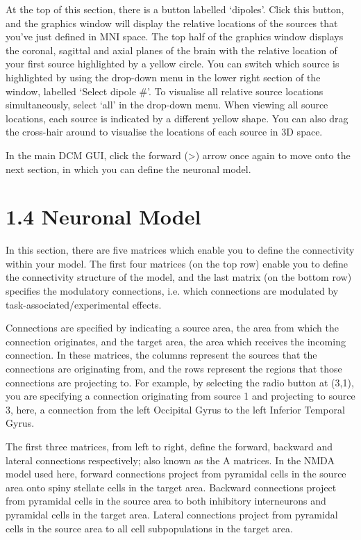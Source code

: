 At the top of this section, there is a button labelled `dipoles'. Click
this button, and the graphics window will display the relative locations
of the sources that you've just defined in MNI space. The top half of
the graphics window displays the coronal, sagittal and axial planes of
the brain with the relative location of your first source highlighted by
a yellow circle. You can switch which source is highlighted by using the
drop-down menu in the lower right section of the window, labelled
`Select dipole \#'. To visualise all relative source locations
simultaneously, select `all' in the drop-down menu. When viewing all
source locations, each source is indicated by a different yellow shape.
You can also drag the cross-hair around to visualise the locations of
each source in 3D space.

In the main DCM GUI, click the forward (\textgreater{}) arrow once again
to move onto the next section, in which you can define the neuronal
model.

\section{\texorpdfstring{\textbf{1.4 Neuronal
Model}}{1.4 Neuronal Model}}\label{neuronal-model}

In this section, there are five matrices which enable you to define the
connectivity within your model. The first four matrices (on the top row)
enable you to define the connectivity structure of the model, and the
last matrix (on the bottom row) specifies the modulatory connections,
i.e. which connections are modulated by task-associated/experimental
effects.

Connections are specified by indicating a source area, the area from
which the connection originates, and the target area, the area which
receives the incoming connection. In these matrices, the columns
represent the sources that the connections are originating from, and the
rows represent the regions that those connections are projecting to. For
example, by selecting the radio button at (3,1), you are specifying a
connection originating from source 1 and projecting to source 3, here, a
connection from the left Occipital Gyrus to the left Inferior Temporal
Gyrus.

The first three matrices, from left to right, define the forward,
backward and lateral connections respectively; also known as the A
matrices. In the NMDA model used here, forward connections project from
pyramidal cells in the source area onto spiny stellate cells in the
target area. Backward connections project from pyramidal cells in the
source area to both inhibitory interneurons and pyramidal cells in the
target area. Lateral connections project from pyramidal cells in the
source area to all cell subpopulations in the target area.

